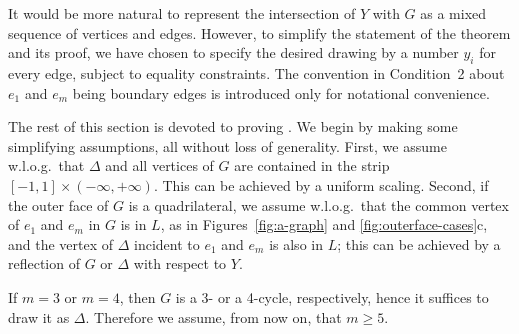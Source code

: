 It would be more natural to represent the intersection of $Y$ with $G$
as a mixed sequence of vertices and edges. However, to simplify the
statement of the theorem and its proof, we have chosen to specify the
desired drawing by a number $y_i$ for every edge, subject to equality
constraints. %
The convention in Condition~2 about $e_1$ and $e_m$ being boundary
edges is introduced only for
 notational convenience.


The rest of this section is devoted to proving . We begin by making some simplifying assumptions, all without loss of generality. 
%
%
%
First, we assume w.l.o.g.\ that $\Delta$ and all vertices of $G$ are
contained in the strip $[-1,1]\times(-\infty,+\infty)$.  This can be
achieved by a uniform scaling.  Second,
if the outer face of $G$ is
 a quadrilateral,
 we assume w.l.o.g.\
that the common vertex of $e_1$ and
$e_m$ in $G$ is in $L$, as in Figures~\ref{fig:a-graph} and
\ref{fig:outerface-cases}c,
and the
vertex of $\Delta$ incident to $e_1$ and $e_m$ is also in $L$;
this can be achieved by a
reflection of $G$ or $\Delta$ with respect to $Y$.



If $m=3$ or $m=4$, then $G$ is a 3- or a 4-cycle, respectively, hence it suffices to draw it as $\Delta$. Therefore we assume, from now on, that $m\ge 5$.  

